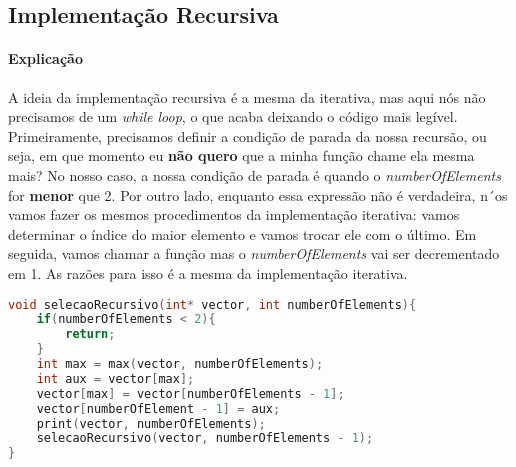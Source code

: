 \subsection{Implementação Recursiva}
\paragraph{Explicação}
A ideia da implementação recursiva é a mesma da iterativa, mas aqui nós não precisamos de um \textit{while loop}, o que acaba deixando o código mais legível. Primeiramente, precisamos
definir a condição de parada da nossa recursão, ou seja, em que momento eu \textbf{não quero} que a minha função chame ela mesma mais? No nosso caso, a nossa condição de parada é
quando o \textit{numberOfElements} for \textbf{menor} que 2. Por outro lado, enquanto essa expressão não é verdadeira, n´os vamos fazer os mesmos procedimentos da implementação
iterativa: vamos determinar o índice do maior elemento e vamos trocar ele com o último. Em seguida, vamos chamar a função mas o \textit{numberOfElements} vai ser decrementado em 1.
As razões para isso é a mesma da implementação iterativa.
\begin{lstlisting}[language=C]
void selecaoRecursivo(int* vector, int numberOfElements){
    if(numberOfElements < 2){
        return;
    }
    int max = max(vector, numberOfElements);
    int aux = vector[max];
    vector[max] = vector[numberOfElements - 1];
    vector[numberOfElement - 1] = aux;
    print(vector, numberOfElements);
    selecaoRecursivo(vector, numberOfElements - 1);
}
\end{lstlisting}

